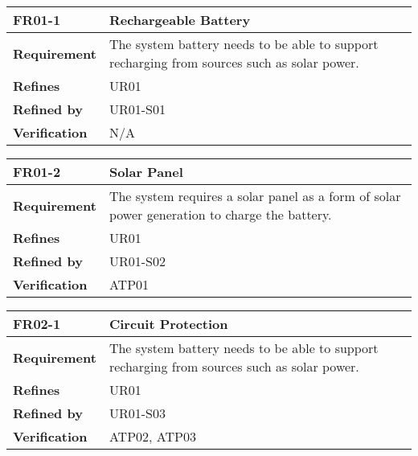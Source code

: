 \documentclass[class=report,11pt,crop=false]{standalone}
\begin{document}
\begin{table}
\centering

\begin{tabular}{| l | l |}
\hline
\textbf{FR01-1} & \textbf{Rechargeable Battery} \\
\hline
\textbf{Requirement} & The system battery needs to be able to support recharging from sources such as solar power. \\
\hline
\textbf{Refines} & UR01 \\
\hline
\textbf{Refined by} & UR01-S01 \\
\hline
\textbf{Verification} & N/A \\
\hline

\end{tabular}

\end{table}

 

\begin{table}
\centering

\begin{tabular}{| l | l |}
\hline
\textbf{FR01-2} & \textbf{Solar Panel} \\
\hline
\textbf{Requirement} & The system requires a solar panel as a form of solar power generation to charge the battery. \\
\hline
\textbf{Refines} & UR01 \\
\hline
\textbf{Refined by} & UR01-S02 \\
\hline
\textbf{Verification} & ATP01 \\
\hline

\end{tabular}

\end{table}

 

\begin{table}
\centering

\begin{tabular}{| l | l |}
\hline
\textbf{FR02-1} & \textbf{Circuit Protection} \\
\hline
\textbf{Requirement} & The system battery needs to be able to support recharging from sources such as solar power. \\
\hline
\textbf{Refines} & UR01 \\
\hline
\textbf{Refined by} & UR01-S03 \\
\hline
\textbf{Verification} & ATP02, ATP03 \\
\hline

\end{tabular}

\end{table}
\end{document}
